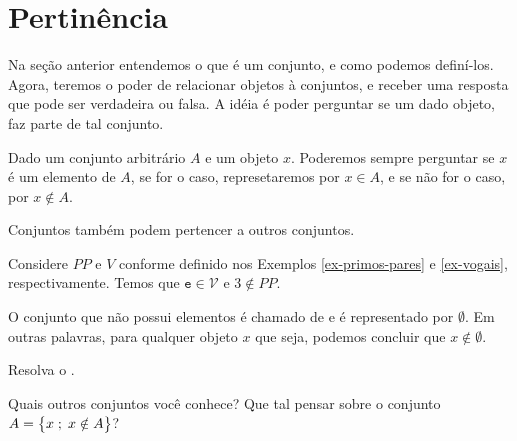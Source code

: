 \section{Pertinência}

Na seção anterior entendemos o que é um conjunto, e como podemos definí-los.
Agora, teremos o poder de relacionar objetos à conjuntos, e receber uma resposta que pode ser verdadeira ou falsa.
A idéia é poder perguntar se um dado objeto, faz parte de tal conjunto.

\begin{definition}
\label{def:in}
Dado um conjunto arbitrário $A$ e um objeto $x$.
Poderemos sempre perguntar se $x$ é um elemento de $A$, se for o caso, represetaremos por $x \in A$, e se não for o caso, por $x \notin A$.
\end{definition}

\begin{remark}
Conjuntos também podem pertencer a outros conjuntos.
\end{remark}

\begin{example}
Considere $PP$ e $V$ conforme definido nos Exemplos \ref{ex-primos-pares} e \ref{ex-vogais}, respectivamente. Temos que $\texttt{e} \in \mathcal{V}$ e $3 \notin PP$.
\end{example}

\begin{definition}
\label{def:emptyset}
	O conjunto que não possui elementos é chamado de  e é representado por $\emptyset$.
	Em outras palavras, para qualquer objeto $x$ que seja, podemos concluir que $x \notin \emptyset$.
\end{definition}

\begin{homework}
	Resolva o .
\end{homework}

\begin{example}
Quais outros conjuntos você conhece? Que tal pensar sobre o conjunto $A = \left\{ x \;;\; x \notin A\right\}$?
\end{example}

